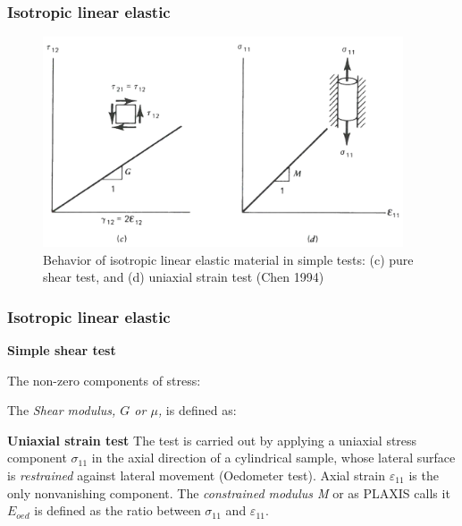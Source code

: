 \documentclass[notes]{beamer}
\begin{document}
\begin{frame}
\frametitle{Isotropic linear elastic}
\begin{figure}
	\includegraphics[width=0.95\textwidth]{figs/isotropic-linear-elastic-1.png}
	\caption*{Behavior of isotropic linear elastic material in simple tests: (c) pure shear test, and (d) uniaxial strain test (Chen 1994)}
\end{figure}
\end{frame}

\begin{frame}
\frametitle{Isotropic linear elastic}
\textbf{Simple shear test}

The non-zero components of stress: 

The \textit{Shear modulus, $G$ or $\mu$,}  is defined as: 

\textbf{Uniaxial strain test}
The test is carried out by applying a uniaxial stress component $\sigma_{11}$ in the axial direction of a cylindrical sample, whose lateral surface is \textit{restrained} against lateral movement (Oedometer test). Axial strain $\varepsilon_11$ is the only nonvanishing component. The \textit{constrained modulus M} or as PLAXIS calls it $E_{oed}$ is defined as the ratio between $\sigma_{11}$ and $\varepsilon_11$.

\end{frame}
\end{document}
